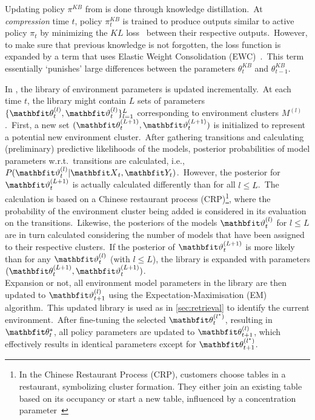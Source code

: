 Updating policy $\pi^{KB}$ from \textcite{Schwarz2018} is done through knowledge distillation.\ At \emph{compression} time $t$, policy $\pi^{KB}_t$ is trained to produce outputs similar to active policy $\pi_t$ by minimizing the $KL$ loss~\cite{Kullback1951} between their respective outputs.\ However, to make sure that previous knowledge is not forgotten, the loss function is expanded by a term that uses Elastic Weight Consolidation (EWC)~\cite{Hinton2015}.\ This term essentially `punishes' large differences between the parameters $\theta^{KB}_t$ and $\theta^{KB}_{t-1}$.

In \textcite{Wang2022}, the library of environment parameters is updated incrementally.\ At each time $t$, the library might contain $L$ sets of parameters $\{\bvec{\theta}^{(l)}_t,\bvec{\vartheta}^{(l)}_t\}^L_{l=1}$ corresponding to environment clusters $M^{(l)}$.\ First, a new set $(\bvec{\theta}^{(L+1)}_t,\bvec{\vartheta}^{(L+1)}_t)$ is initialized to represent a potential new environment cluster.\ After gathering transitions and calculating (preliminary) predictive likelihoods of the models, posterior probabilities of model parameters w.r.t.\ transitions are calculated, i.e., $P(\bvec{\vartheta}^{(l)}_t|\bvec{X}{_t}, \bvec{Y}_t)$.\ However, the posterior for $\bvec{\vartheta}^{(L+1)}_t$ is actually calculated differently than for all $l\leq L$.\ The calculation is based on a Chinese restaurant process (CRP)\footnote{In the Chinese Restaurant Process (CRP), customers choose tables in a restaurant, symbolizing cluster formation. They either join an existing table based on its occupancy or start a new table, influenced by a concentration parameter~\cite{Wang2022, Pitman2006}}, where the probability of the environment cluster being added is considered in its evaluation on the transitions.\ Likewise, the posteriors of the models $\bvec{\vartheta}^{(l)}_t$ for $l\leq L$ are in turn calculated considering the number of models that have been assigned to their respective clusters.\ If the posterior of $\bvec{\vartheta}^{(L+1)}_t$ is more likely than for any $\bvec{\vartheta}^{(l)}_t$ (with $l\leq L$), the library is expanded with parameters $(\bvec{\theta}^{(L+1)}_t,\bvec{\vartheta}^{(L+1)}_t)$.\\
Expansion or not, all environment model parameters in the library are then updated to $\bvec{\vartheta}^{(l)}_{t+1}$ using the Expectation-Maximisation (EM) algorithm.\ This updated library is used as in \cref{sec:retrieval} to identify the current environment.\ After fine-tuning the selected $\bvec{\theta}^{(l^*)}_t$, resulting in $\bvec{\theta}^*_t$, all policy parameters are updated to $\bvec{\theta}^{(l)}_{t+1}$, which effectively results in identical parameters except for $\bvec{\theta}^{(l^*)}_{t+1}$.

